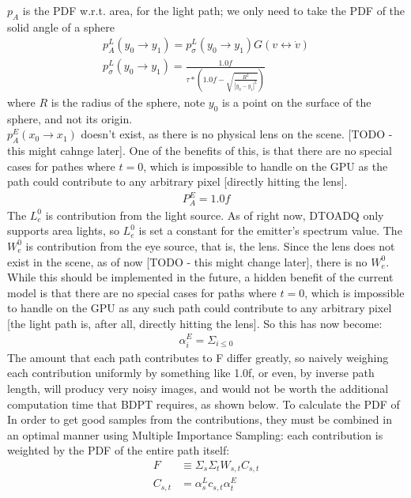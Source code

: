 \documentclass{article}
\begin{document}
     $p_A$ is
    the PDF w.r.t. area, for the light path; we only need to take the PDF of the
    solid angle of a sphere
  \begin{align}
    p_A^L(y_0 \rightarrow y_1) = p_{\sigma}^L(y_0 \rightarrow y_1) G(v
    \leftrightarrow \dot{v})\\
    p_{\sigma}^L(y_0 \rightarrow y_1) = \frac{1.0f}{\tau * (1.0f -
    \sqrt{\frac{R^2}{|y_0 - y_1|^2}})}
  \end{align}
    where $R$ is the radius of the sphere, note $y_0$ is a point on the surface
    of the sphere, and not its origin.
    \\$p_A^E(x_0 \rightarrow x_1)$ doesn't exist, as there is no physical lens
    on the scene. [TODO - this might cahnge later]. One of the benefits of this,
    is that there are no special cases for pathes where $t = 0$, which is
    impossible to handle on the GPU as the path could contribute to any
    arbitrary pixel [directly hitting the lens].
  \begin{align}
    P_A^E = 1.0f
  \end{align}
    The $L^0_e$ is contribution from the light source. As of right now, DTOADQ
    only supports area lights, so $L^0_e$ is set a constant for the emitter's
    spectrum value.
    The $W_e^0$ is contribution from the eye source, that is, the lens. Since
    the lens does not exist in the scene, as of now [TODO - this might change
    later], there is no $W_e^0$. While this should be implemented in the future,
    a hidden benefit of the current model is that there are no special cases for
    paths where $t = 0$, which is impossible to handle on the GPU as any such
    path could contribute to any arbitrary pixel [the light path is, after all,
    directly hitting the lens]. So this has now become:
  \begin{align}
    \alpha_i^E = \Sigma_{i\leq 0} 
  \end{align}
  The amount that each path contributes to F differ greatly, so naively
  weighing each contribution uniformly by something like 1.0f, or even, by
  inverse path length, will producy very noisy images, and would not be
  worth the additional computation time that BDPT requires, as shown below.
  	 To calculate the PDF of 
  In order to get good
  samples from the contributions, they must be combined in an optimal manner
  using Multiple Importance Sampling: each contribution is weighted by the PDF
  of the entire path itself:
  \begin{align*}
    F &\equiv \Sigma_s\Sigma_tW_{s, t}C_{s, t}\\
    C_{s, t} &= \alpha^L_s c_{s, t} \alpha^E_t
  \end{align*}
\end{document}
